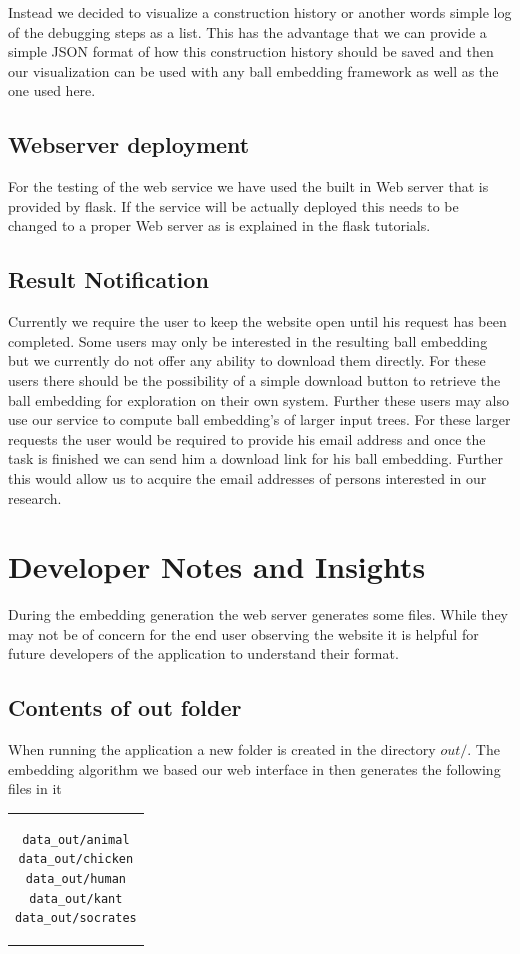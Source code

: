 \documentclass[]{article}
\begin{document}
Instead we decided to visualize a construction history or another words simple log of the debugging steps as a list. This has the advantage that we can provide a simple JSON format of how this construction history should be saved and then our visualization can be used with any ball embedding framework as well as the one used here.
\subsection{Webserver deployment}
For the testing of the web service we have used the built in Web server that is provided by flask. If the service will be actually deployed this needs to be changed to a proper Web server as is explained in the flask tutorials.
\subsection{Result Notification}
Currently we require the user to keep the website open until his request has been completed. Some users may only be interested in the resulting ball embedding but we currently do not offer any ability to download them directly. For these users there should be the possibility of a simple download button to retrieve the ball embedding for exploration on their own system. Further these users may also use our service to compute ball embedding's of larger input trees. For these larger requests the user would be required to provide his email address and once the task is finished we can send him a download link for his ball embedding. Further this would allow us to acquire the email addresses of persons interested in our research.


\section{Developer Notes and Insights}
During the embedding generation the web server generates some files. While they may not be of concern for the end user observing the website it is helpful for future developers of the application to understand their format.

\subsection{Contents of out folder}
When running the application a new folder is created in the directory $out/$. The embedding algorithm we based our web interface in then generates the following files in it

\begin{center}

\begin{tabular}{c}
\begin{lstlisting}
data_out/animal
data_out/chicken
data_out/human
data_out/kant
data_out/socrates
\end{lstlisting}
\end{tabular}
\end{center}
\end{document}
